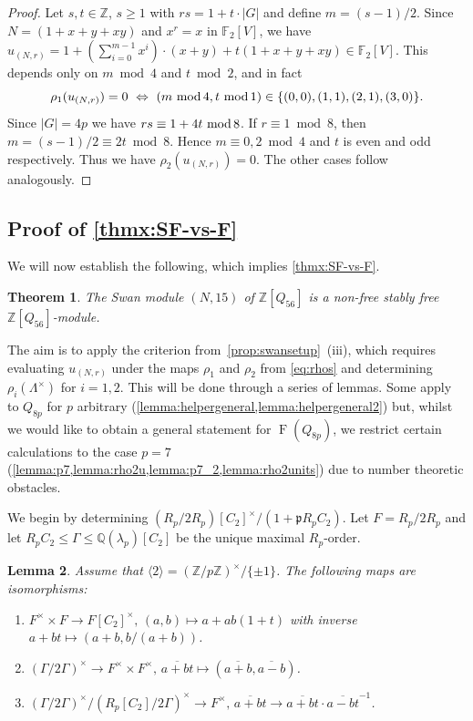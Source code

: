 \documentclass[11pt,leqno,a4paper]{amsart}
\newcommand{\Q}{\mathbb{Q}}
\newcommand{\Z}{\mathbb{Z}}
\newcommand{\F}{\mathbb{F}}
\renewcommand{\mod}{\,\,\text{\normalfont mod}\,}
\DeclareMathOperator{\FF}{F}
\newtheorem{thm}{Theorem}[section]
\newtheorem{lemma}[thm]{Lemma}
\theoremstyle{definition}
\theoremstyle{remark}
\theoremstyle{custom}
\newenvironment{clist}[1]
{\begin{enumerate}[\normalfont #1]}
{\end{enumerate}}
\begin{document}
\begin{proof}
Let $s, t \in \Z$, $s \geq 1$ with $rs = 1 + t \cdot \lvert G \rvert$ and define $m = (s - 1)/2$.
Since $N = (1 + x + y + xy)$ and $x^r = x$ in $\F_2[V]$, we have $u_{(N, r)} = 1 + (\sum_{i=0}^{m-1} x^i) \cdot (x + y) + t(1 + x + y + xy) \in \F_2[V]$.
This depends only on $m \bmod 4$ and $t \bmod 2$, and in fact
\[ \rho_1(u_{(N, r)}) = 0 \ \Leftrightarrow \ (m \mod 4, t \mod 1) \in \{ (0, 0), (1, 1), (2, 1), (3, 0)\}.\]
Since $\lvert G \rvert = 4p$ we have $rs \equiv 1 + 4t \mod 8$. If $r \equiv 1 \bmod 8$, then $m = (s - 1)/2 \equiv 2t \bmod 8$. Hence $m \equiv 0, 2 \bmod 4$ and $t$ is even and odd respectively. Thus we have $\rho_2(u_{(N, r)}) = 0$. The other cases follow analogously.
\end{proof}

\subsection{Proof of \cref{thmx:SF-vs-F}}
\label{ss:swan-proof}

We will now establish the following, which implies \cref{thmx:SF-vs-F}.

\begin{thm}\label{cor:N15}
The Swan module $(N, 15)$ of $\Z[Q_{56}]$ is a non-free stably free $\Z[Q_{56}]$-module.
\end{thm}

The aim is to apply the criterion from~\cref{prop:swansetup}~(iii), which requires evaluating $u_{(N, r)}$ under the maps $\rho_1$ and $\rho_2$ from \cref{eq:rhos} and determining $\rho_i(\Lambda^\times)$ for $i = 1,2$. This will be done through a series of lemmas.
Some apply to $Q_{8p}$ for $p$ arbitrary (\cref{lemma:helpergeneral,lemma:helpergeneral2}) but, whilst we would like to obtain a general statement for $\FF(Q_{8p})$, we restrict certain calculations to the case $p = 7$ (\cref{lemma:p7,lemma:rho2u,lemma:p7_2,lemma:rho2units}) due to number theoretic obstacles.

We begin by determining
${(R_p/2R_p)[C_2]^\times}/(1+\mathfrak{p}R_pC_2)$.
Let $F = R_p/2R_p$ and let $R_pC_2 \le \Gamma \le \Q(\lambda_p)[C_2]$ be the unique maximal $R_p$-order.

\begin{lemma}\label{lemma:helpergeneral}
Assume that $\langle 2 \rangle = (\Z/p\Z)^\times/\{\pm 1\}$.
The following maps are isomorphisms:
\begin{clist}{(i)}
\item
$F^\times \times F \to F[C_2]^\times, \, (a, b) \mapsto a + ab(1 + t)$
 with inverse $a + bt \mapsto (a + b, b/(a + b))$.
\item
$(\Gamma/2\Gamma)^\times \to F^\times \times F^\times, \, \overline{a + bt} \mapsto (\overline{a + b}, \overline{a - b})$.
    \item
$(\Gamma/2\Gamma)^\times/(R_p[C_2]/2\Gamma)^\times \to F^\times, \, \overline{a + bt} \to \overline{a + bt}\cdot \overline{a - bt}^{-1}$.
\end{clist}
\end{lemma}
\end{document}

